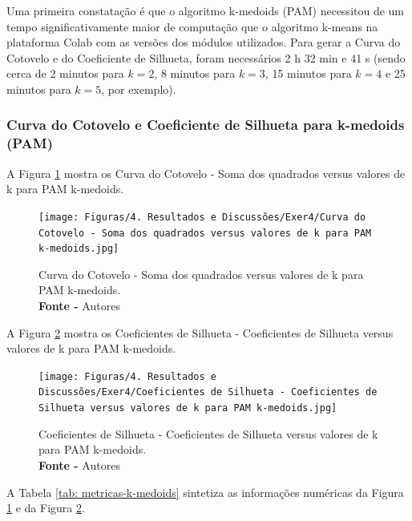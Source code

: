 Uma primeira constatação é que o algoritmo k-medoids (PAM) necessitou de um tempo significativamente maior de computação que o algoritmo k-means na plataforma Colab com as versões dos módulos utilizados. Para gerar a Curva do Cotovelo e do Coeficiente de Silhueta, foram necessários 2 h 32 min e 41 s (sendo cerca de 2 minutos para $k = 2$, 8 minutos para $k = 3$, 15 minutos para $k = 4$ e 25 minutos para $k = 5$, por exemplo).
 
\subsubsection{Curva do Cotovelo e Coeficiente de Silhueta para k-medoids (PAM)}
 
 A Figura \ref{fig: Curva do Cotovelo - Soma dos quadrados versus valores de k para PAM k-medoids} mostra os Curva do Cotovelo - Soma dos quadrados versus valores de k para PAM k-medoids.
\begin{figure}[H]
    \centering
    \texttt{[image: Figuras/4. Resultados e Discussões/Exer4/Curva do Cotovelo - Soma dos quadrados versus valores de k para PAM k-medoids.jpg]}
    \caption{Curva do Cotovelo - Soma dos quadrados versus valores de k para PAM k-medoids.\\ \textbf{Fonte -} Autores}
    \label{fig: Curva do Cotovelo - Soma dos quadrados versus valores de k para PAM k-medoids}
\end{figure}

A Figura \ref{fig: Coeficientes de Silhueta - Coeficientes de Silhueta versus valores de k para PAM k-medoids} mostra os Coeficientes de Silhueta - Coeficientes de Silhueta versus valores de k para PAM k-medoids.
\begin{figure}[H]
    \centering
    \texttt{[image: Figuras/4. Resultados e Discussões/Exer4/Coeficientes de Silhueta - Coeficientes de Silhueta versus valores de k para PAM k-medoids.jpg]}
    \caption{Coeficientes de Silhueta - Coeficientes de Silhueta versus valores de k para PAM k-medoids.\\ \textbf{Fonte -} Autores}
    \label{fig: Coeficientes de Silhueta - Coeficientes de Silhueta versus valores de k para PAM k-medoids}
\end{figure}

A Tabela \ref{tab: metricas-k-medoids} sintetiza as informações numéricas da Figura \ref{fig: Curva do Cotovelo - Soma dos quadrados versus valores de k para PAM k-medoids} e da Figura \ref{fig: Coeficientes de Silhueta - Coeficientes de Silhueta versus valores de k para PAM k-medoids}.
 

